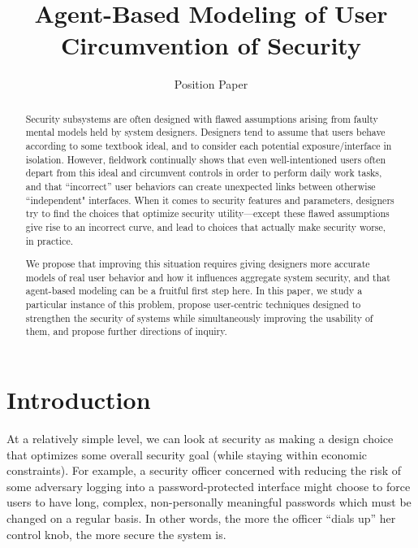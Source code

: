 \documentclass{acm_proc_article-sp}
\begin{document}
\title{Agent-Based Modeling of User Circumvention of Security}
\subtitle{Position Paper}

\maketitle

\setlength{\parindent}{1cm}


\begin{abstract}
Security subsystems are often designed with flawed assumptions arising from faulty
mental models held by system designers. 
Designers tend to assume that users behave according to some textbook ideal,
and to consider each potential exposure/interface in isolation.
However, fieldwork 
continually shows that even well-intentioned users often depart from this ideal
and circumvent controls in order to perform daily work tasks, and
that ``incorrect'' user behaviors can create unexpected links between 
otherwise ``independent" interfaces.
When it comes to security features and parameters,
designers try to find the choices that optimize security utility---except
these flawed assumptions give rise to an incorrect curve, and lead
to choices that actually make security worse, in practice.

We propose that improving this situation requires giving designers more
accurate models of real user behavior and how it influences aggregate system
security, and that agent-based modeling can be a fruitful 
first step here.
In this paper, we study a
particular instance of this problem, propose
user-centric techniques designed to strengthen the security of systems
while simultaneously improving the usability of them, and propose
further directions of inquiry.
\end{abstract}

\section{Introduction}

At a relatively simple level, we can look at security as
making a design choice that optimizes some overall security goal (while staying within economic constraints).   For example,
a security officer concerned with reducing the risk of some adversary
logging into a password-protected interface might choose to force users
to have long, complex, non-personally meaningful passwords which must be changed on a regular basis.  In other words, the more the officer ``dials up'' her control knob, the more secure the system is.     
\end{document}
